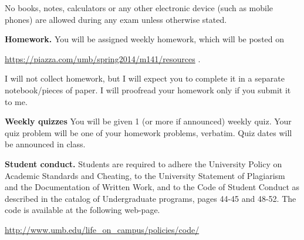 \documentclass{article}
\begin{document}
No books, notes, calculators or any other electronic device (such as mobile phones) are allowed during any exam unless otherwise stated.

\medskip
\noindent \textbf{Homework.} You will be assigned weekly homework, which will be posted on

\url{https://piazza.com/umb/spring2014/m141/resources} \quad \quad \quad .

\noindent I will not collect homework, but I will expect you to complete it in a separate notebook/pieces of paper. I will proofread your homework only if you submit it to me.
 
 \medskip
\noindent \textbf{Weekly quizzes} You will be given 1 (or more if announced) weekly quiz. Your quiz problem will be one of your homework problems, verbatim. Quiz dates will be announced in class. 



\medskip
\noindent \textbf{Student conduct.} Students  are required to adhere the University Policy on Academic Standards and Cheating, to the University Statement of Plagiarism and the Documentation of Written Work, and to the Code of Student Conduct as described in the catalog of Undergraduate programs, pages 44-45 and 48-52. The code is available at the following web-page.

\noindent\url{http://www.umb.edu/life_on_campus/policies/code/}

\medskip
\end{document}
